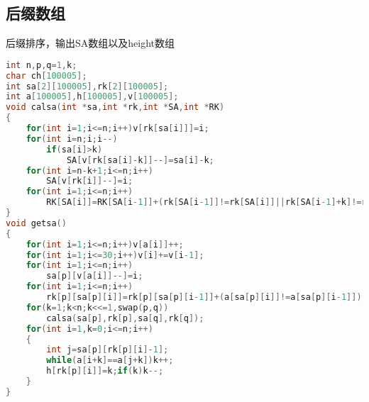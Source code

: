 \subsection{后缀数组}
后缀排序，输出SA数组以及height数组
\begin{lstlisting}[language=C] 
int n,p,q=1,k;
char ch[100005];
int sa[2][100005],rk[2][100005];
int a[100005],h[100005],v[100005];
void calsa(int *sa,int *rk,int *SA,int *RK)
{
	for(int i=1;i<=n;i++)v[rk[sa[i]]]=i;
	for(int i=n;i;i--)
		if(sa[i]>k)
			SA[v[rk[sa[i]-k]]--]=sa[i]-k;
	for(int i=n-k+1;i<=n;i++)
		SA[v[rk[i]]--]=i;
	for(int i=1;i<=n;i++)
		RK[SA[i]]=RK[SA[i-1]]+(rk[SA[i-1]]!=rk[SA[i]]||rk[SA[i-1]+k]!=rk[SA[i]+k]);
}
void getsa()
{
	for(int i=1;i<=n;i++)v[a[i]]++;
	for(int i=1;i<=30;i++)v[i]+=v[i-1];
	for(int i=1;i<=n;i++)
		sa[p][v[a[i]]--]=i;
	for(int i=1;i<=n;i++)
		rk[p][sa[p][i]]=rk[p][sa[p][i-1]]+(a[sa[p][i]]!=a[sa[p][i-1]]);
	for(k=1;k<n;k<<=1,swap(p,q))
		calsa(sa[p],rk[p],sa[q],rk[q]);
	for(int i=1,k=0;i<=n;i++)
	{
		int j=sa[p][rk[p][i]-1];
		while(a[i+k]==a[j+k])k++;
		h[rk[p][i]]=k;if(k)k--;
	}
}
\end{lstlisting}